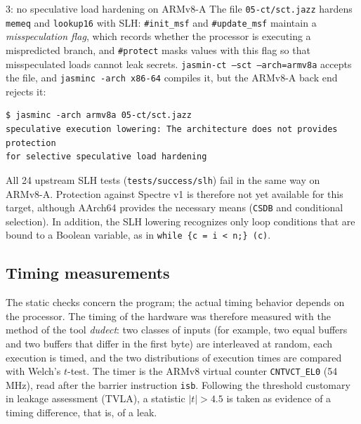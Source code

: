 \documentclass[11pt,a4paper]{article}
\newcommand{\file}[1]{\texttt{#1}}
\begin{document}
\begin{finding}{3: no speculative load hardening on ARMv8-A}
The file \file{05-ct/sct.jazz} hardens \texttt{memeq} and \texttt{lookup16}
with SLH: \texttt{\#init\_msf} and \texttt{\#update\_msf} maintain a
\emph{misspeculation flag}, which records whether the processor is
executing a mispredicted branch, and \texttt{\#protect} masks values with
this flag so that misspeculated loads cannot leak secrets.
\texttt{jasmin-ct --sct --arch=armv8a} accepts the file, and
\texttt{jasminc -arch x86-64} compiles it, but the ARMv8-A back end rejects
it:
\begin{lstlisting}[style=output]
$ jasminc -arch armv8a 05-ct/sct.jazz
speculative execution lowering: The architecture does not provides protection
for selective speculative load hardening
\end{lstlisting}
All 24 upstream SLH tests (\file{tests/success/slh}) fail in the same way on
ARMv8-A. Protection against Spectre v1 is therefore not yet available for
this target, although AArch64 provides the necessary means (\texttt{CSDB}
and conditional selection). In addition, the SLH lowering recognizes only
loop conditions that are bound to a Boolean variable, as in
\lstinline[style=jasmin,numbers=none,frame=none]|while {c = i < n;} (c)|.
\end{finding}

\subsection{Timing measurements}

The static checks concern the program; the actual timing behavior depends
on the processor. The timing of the hardware was therefore measured with the
method of the tool \emph{dudect}: two classes of inputs (for example, two
equal buffers and two buffers that differ in the first byte) are
interleaved at random, each execution is timed, and the two distributions of
execution times are compared with Welch's $t$-test. The timer is the ARMv8
virtual counter \texttt{CNTVCT\_EL0} (54\,MHz), read after the barrier
instruction \texttt{isb}. Following the threshold customary in leakage
assessment (TVLA), a statistic $|t| > 4.5$ is taken as evidence of a timing
difference, that is, of a leak.


\end{document}
